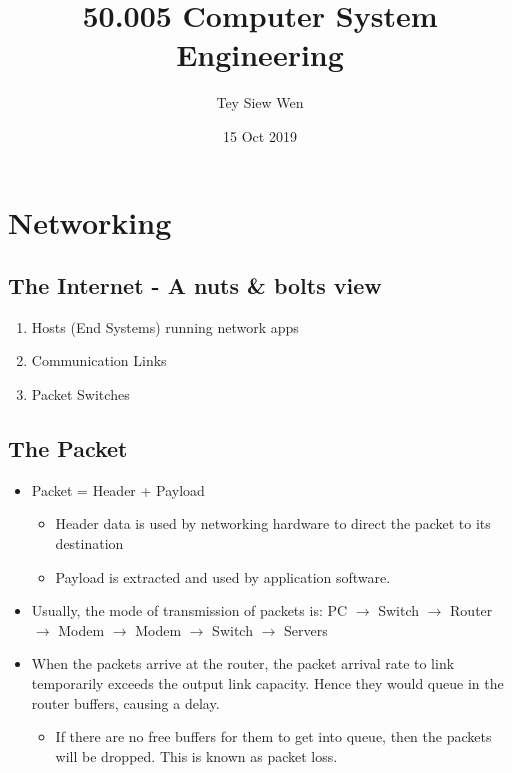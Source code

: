 \documentclass[a4paper]{article}
\title{50.005 Computer System Engineering}
\author{Tey Siew Wen}
\date{15 Oct 2019}
\begin{document}
\maketitle
	
\tableofcontents
	
\newpage

\section{Networking}
\subsection{The Internet - A nuts \& bolts view}
\begin{enumerate}
	\item Hosts (End Systems) running network apps
	\item Communication Links
	\item Packet Switches
\end{enumerate}	
\subsection{The Packet}
\begin{itemize}
	\item Packet = Header + Payload
	\begin{itemize}[label=$\circ$]
		\item Header data is used by networking hardware to direct the packet to its destination
		\item Payload is extracted and used by application software.
	\end{itemize}
	\item Usually, the mode of transmission of packets is: PC $\rightarrow$ Switch $\rightarrow$ Router $\rightarrow$ Modem $\rightarrow$ Modem $\rightarrow$ Switch $\rightarrow$ Servers
	\item When the packets arrive at the router, the packet arrival rate to link temporarily exceeds the output link capacity. Hence they would queue in the router buffers, causing a delay.
	\begin{itemize}[label=$\circ$]
		\item If there are no free buffers for them to get into queue, then the packets will be dropped. This is known as packet loss.
	\end{itemize}
\end{itemize}
\end{document}
